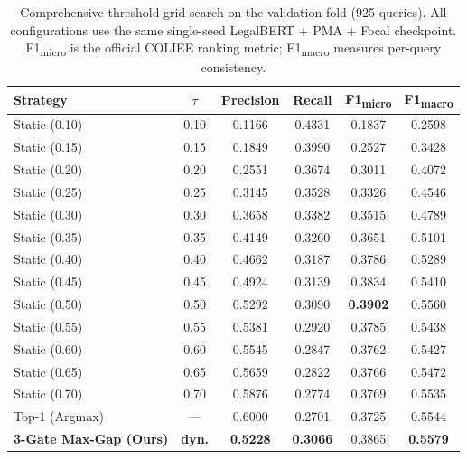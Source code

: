 \documentclass[sigconf]{acmart}
\newcommand{\rev}[1]{{\color{blue}#1}}
\begin{document}
\begin{table}[t]
  \caption{\rev{Comprehensive threshold grid search on the validation fold (925 queries). All configurations use the same single-seed LegalBERT + PMA + Focal checkpoint. F1\textsubscript{micro} is the official COLIEE ranking metric; F1\textsubscript{macro} measures per-query consistency.}}
  \label{tab:threshold_ablation}
  \small
  \begin{tabular}{@{}l c c c c c@{}}
    \toprule
    \textbf{Strategy} & \textbf{$\tau$} & \textbf{Precision} & \textbf{Recall} & \textbf{F1\textsubscript{micro}} & \textbf{F1\textsubscript{macro}} \\
    \midrule
    Static (0.10) & 0.10 & 0.1166 & 0.4331 & 0.1837 & 0.2598 \\
    Static (0.15) & 0.15 & 0.1849 & 0.3990 & 0.2527 & 0.3428 \\
    Static (0.20) & 0.20 & 0.2551 & 0.3674 & 0.3011 & 0.4072 \\
    Static (0.25) & 0.25 & 0.3145 & 0.3528 & 0.3326 & 0.4546 \\
    Static (0.30) & 0.30 & 0.3658 & 0.3382 & 0.3515 & 0.4789 \\
    Static (0.35) & 0.35 & 0.4149 & 0.3260 & 0.3651 & 0.5101 \\
    Static (0.40) & 0.40 & 0.4662 & 0.3187 & 0.3786 & 0.5289 \\
    Static (0.45) & 0.45 & 0.4924 & 0.3139 & 0.3834 & 0.5410 \\
    Static (0.50) & 0.50 & 0.5292 & 0.3090 & \textbf{0.3902} & 0.5560 \\
    Static (0.55) & 0.55 & 0.5381 & 0.2920 & 0.3785 & 0.5438 \\
    Static (0.60) & 0.60 & 0.5545 & 0.2847 & 0.3762 & 0.5427 \\
    Static (0.65) & 0.65 & 0.5659 & 0.2822 & 0.3766 & 0.5472 \\
    Static (0.70) & 0.70 & 0.5876 & 0.2774 & 0.3769 & 0.5535 \\
    \midrule
    Top-1 (Argmax) & --- & 0.6000 & 0.2701 & 0.3725 & 0.5544 \\
    \textbf{3-Gate Max-Gap (Ours)} & \textbf{dyn.} & \textbf{0.5228} & \textbf{0.3066} & 0.3865 & \textbf{0.5579} \\
    \bottomrule
  \end{tabular}
\end{table}
\end{document}
